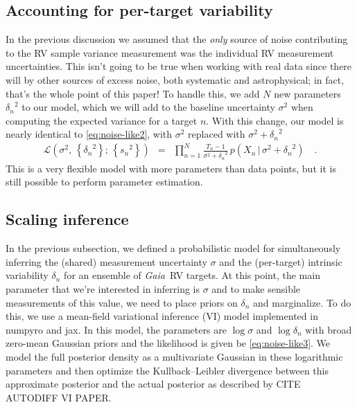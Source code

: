 \documentclass[modern, letterpaper]{aastex631}
\newcommand{\package}[1]{\textsf{#1}}
\newcommand{\project}[1]{\textsl{#1}}
\newcommand{\Gaia}{\project{Gaia}}
\begin{document}
\subsection{Accounting for per-target variability}

In the previous discussion we assumed that the \emph{only} source of noise contributing to the RV sample variance measurement was the individual RV measurement uncertainties.
This isn't going to be true when working with real data since there will by other sources of excess noise, both systematic and astrophysical; in fact, that's the whole point of this paper!
To handle this, we add $N$ new parameters ${\delta_n}^2$ to our model, which we will add to the baseline uncertainty $\sigma^2$ when computing the expected variance for a target $n$.
With this change, our model is nearly identical to \autoref{eq:noise-like2}, with $\sigma^2$ replaced with $\sigma^2 + {\delta_n}^2$
\begin{eqnarray}
	\label{eq:noise-like3}
	\mathcal{L}(\sigma^2,\,\left\{{\delta_n}^2\right\};\,\left\{{s_n}^2\right\}) &=& \prod_{n=1}^N \frac{T_n - 1}{\sigma^2 + {\delta_n}^2}\,p(X_n\,|\,\sigma^2 + {\delta_n}^2) \quad.
\end{eqnarray}
This is a very flexible model with more parameters than data points, but it is still possible to perform parameter estimation.

\subsection{Scaling inference}

In the previous subsection, we defined a probabilistic model for simultaneously inferring the (shared) measurement uncertainty $\sigma$ and the (per-target) intrinsic variability $\delta_n$ for an ensemble of \Gaia\ RV targets.
At this point, the main parameter that we're interested in inferring is $\sigma$ and to make sensible measurements of this value, we need to place priors on $\delta_n$ and marginalize.
To do this, we use a mean-field variational inference (VI) model implemented in \package{numpyro} and \package{jax}.
In this model, the parameters are $\log \sigma$ and $\log \delta_n$ with broad zero-mean Gaussian priors and the likelihood is given be \autoref{eq:noise-like3}.
We model the full posterior density as a multivariate Gaussian in these logarithmic parameters and then optimize the Kullback--Leibler divergence between this approximate posterior and the actual posterior as described by CITE AUTODIFF VI PAPER.
\end{document}
